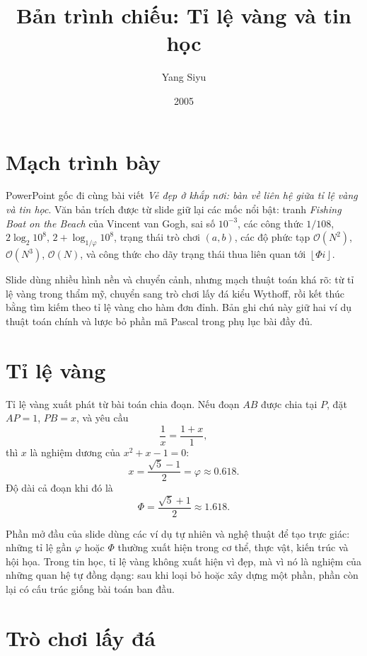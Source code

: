 \documentclass[11pt]{article}
\title{Bản trình chiếu: Tỉ lệ vàng và tin học}
\author{Yang Siyu}
\date{2005}
\newcommand{\Oh}{\mathcal{O}}
\newcommand{\floor}[1]{\left\lfloor #1\right\rfloor}
\begin{document}
\maketitle


\section{Mạch trình bày}

PowerPoint gốc đi cùng bài viết \emph{Vẻ đẹp ở khắp nơi: bàn về liên hệ giữa
tỉ lệ vàng và tin học}. Văn bản trích được từ slide giữ lại các mốc nổi bật:
tranh \textit{Fishing Boat on the Beach} của Vincent van Gogh, sai số
\(10^{-3}\), các công thức \(1/108\), \(2\log_2 10^8\),
\(2+\log_{1/\varphi}10^8\), trạng thái trò chơi \((a,b)\), các độ phức tạp
\(\Oh(N^2)\), \(\Oh(N^3)\), \(\Oh(N)\), và công thức cho dãy trạng thái thua
liên quan tới \(\floor{\Phi i}\).

Slide dùng nhiều hình nền và chuyển cảnh, nhưng mạch thuật toán khá rõ: từ
tỉ lệ vàng trong thẩm mỹ, chuyển sang trò chơi lấy đá kiểu Wythoff, rồi kết
thúc bằng tìm kiếm theo tỉ lệ vàng cho hàm đơn đỉnh. Bản ghi chú này giữ hai
ví dụ thuật toán chính và lược bỏ phần mã Pascal trong phụ lục bài đầy đủ.

\section{Tỉ lệ vàng}

Tỉ lệ vàng xuất phát từ bài toán chia đoạn. Nếu đoạn \(AB\) được chia tại
\(P\), đặt \(AP=1\), \(PB=x\), và yêu cầu
\[
  \frac{1}{x}=\frac{1+x}{1},
\]
thì \(x\) là nghiệm dương của \(x^2+x-1=0\):
\[
  x=\frac{\sqrt5-1}{2}=\varphi\approx 0.618.
\]
Độ dài cả đoạn khi đó là
\[
  \Phi=\frac{\sqrt5+1}{2}\approx 1.618.
\]

Phần mở đầu của slide dùng các ví dụ tự nhiên và nghệ thuật để tạo trực giác:
những tỉ lệ gần \(\varphi\) hoặc \(\Phi\) thường xuất hiện trong cơ thể, thực
vật, kiến trúc và hội họa. Trong tin học, tỉ lệ vàng không xuất hiện vì đẹp,
mà vì nó là nghiệm của những quan hệ tự đồng dạng: sau khi loại bỏ hoặc xây
dựng một phần, phần còn lại có cấu trúc giống bài toán ban đầu.

\section{Trò chơi lấy đá}
\end{document}
